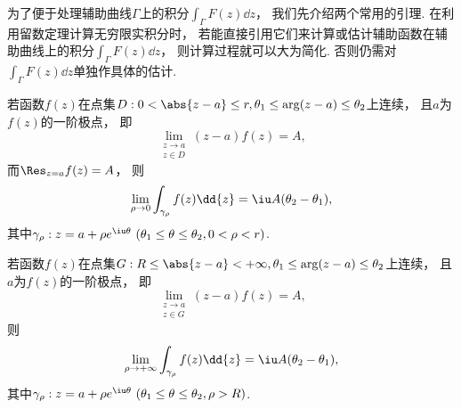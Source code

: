 为了便于处理辅助曲线\(\Gamma\)上的积分\(\int_\Gamma F(z) \dd{z}\)，
我们先介绍两个常用的引理.
在利用留数定理计算无穷限实积分时，
若能直接引用它们来计算或估计辅助函数在辅助曲线上的积分\(\int_\Gamma F(z) \dd{z}\)，
则计算过程就可以大为简化.
否则仍需对\(\int_\Gamma F(z) \dd{z}\)单独作具体的估计.

\begin{lemma}\label{theorem:留数定理.计算积分路径上没有奇点的无穷限积分.引理1}
若函数\(f(z)\)在点集\(D: 0<\abs{z-a}\leq r, \theta_1 \leq \arg(z-a) \leq \theta_2\)上连续，
且\(a\)为\(f(z)\)的一阶极点，
即\begin{equation}
	\lim_{\substack{z \to a \\ z \in D}} (z-a) f(z) = A,
\end{equation}
而\(\Res_{z=a} f(z) = A\)，
则\begin{equation}
	\lim_{\rho\to0} \int_{\gamma_{\rho}} f(z) \dd{z}
	= \iu A (\theta_2-\theta_1),
\end{equation}
其中\(\gamma_{\rho}: z=a+\rho e^{\iu\theta}\ (\theta_1 \leq \theta \leq \theta_2, 0 < \rho < r)\).

若函数\(f(z)\)在点集\(G: R \leq \abs{z-a} < +\infty, \theta_1 \leq \arg(z-a) \leq \theta_2\)上连续，
且\(a\)为\(f(z)\)的一阶极点，
即\begin{equation}
	\lim_{\substack{z \to a \\ z \in G}} (z-a) f(z) = A,
\end{equation}
则\begin{equation}
	\lim_{\rho\to+\infty} \int_{\gamma_{\rho}} f(z) \dd{z}
	= \iu A (\theta_2-\theta_1),
\end{equation}
其中\(\gamma_{\rho}: z=a+\rho e^{\iu\theta}\ (\theta_1 \leq \theta \leq \theta_2, \rho > R)\).
\end{lemma}

